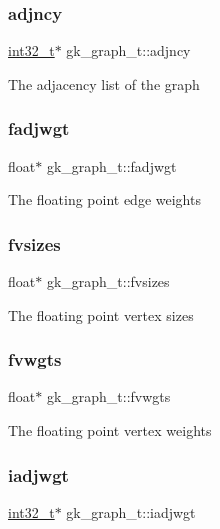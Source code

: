 \subsubsection{\texorpdfstring{adjncy}{adjncy}}
{\footnotesize\ttfamily \hyperlink{ms__stdint_8h_a37994e3b11c72957c6f454c6ec96d43d}{int32\+\_\+t}$\ast$ gk\+\_\+graph\+\_\+t\+::adjncy}

The adjacency list of the graph \mbox{\label{structgk__graph__t_a96d4bbf3a3f9958549d53160d6f6d3aa}} 
\subsubsection{\texorpdfstring{fadjwgt}{fadjwgt}}
{\footnotesize\ttfamily float$\ast$ gk\+\_\+graph\+\_\+t\+::fadjwgt}

The floating point edge weights \mbox{\label{structgk__graph__t_ab43a62e6f11f9cd20c5b6b7d3d02bb0e}} 
\subsubsection{\texorpdfstring{fvsizes}{fvsizes}}
{\footnotesize\ttfamily float$\ast$ gk\+\_\+graph\+\_\+t\+::fvsizes}

The floating point vertex sizes \mbox{\label{structgk__graph__t_a900444f2ba7d2ecaf89591f85c849991}} 
\subsubsection{\texorpdfstring{fvwgts}{fvwgts}}
{\footnotesize\ttfamily float$\ast$ gk\+\_\+graph\+\_\+t\+::fvwgts}

The floating point vertex weights \mbox{\label{structgk__graph__t_aa5c9adf88207adf2bd0cc100042f335b}} 
\subsubsection{\texorpdfstring{iadjwgt}{iadjwgt}}
{\footnotesize\ttfamily \hyperlink{ms__stdint_8h_a37994e3b11c72957c6f454c6ec96d43d}{int32\+\_\+t}$\ast$ gk\+\_\+graph\+\_\+t\+::iadjwgt}

